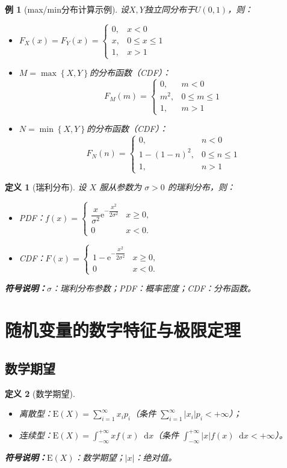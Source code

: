 \documentclass{article}
\newcommand{\E}{\mathrm{E}}
\newcommand{\dif}{\mathop{}\!\mathrm{d}}
\newcommand{\e}{\mathrm{e}}
\newcommand{\symnote}[1]{\par\noindent\textbf{符号说明：}#1\par}
\newcommand{\maxrv}[2]{\max\left\{#1,#2\right\}}
\newcommand{\minrv}[2]{\min\left\{#1,#2\right\}}
\theoremstyle{mytheorem}
\newtheorem{definition}{定义}[section]
\newtheorem{example}{例}[section]
\begin{document}
\begin{example}[max/min分布计算示例]
设$X,Y$独立同分布于$U(0,1)$，则：
\begin{itemize}
    \item $F_X(x)=F_Y(x)=\begin{cases}0, & x<0 \\ x, & 0\leq x\leq1 \\ 1, & x>1\end{cases}$

    \item $M=\maxrv{X}{Y}$的分布函数（CDF）：
    $$
    F_M(m)=\begin{cases}0, & m<0 \\ m^2, & 0\leq m\leq1 \\ 1, & m>1\end{cases}
    $$

    \item $N=\minrv{X}{Y}$的分布函数（CDF）：
    $$
    F_N(n)=\begin{cases}0, & n<0 \\ 1-(1-n)^2, & 0\leq n\leq1 \\ 1, & n>1\end{cases}
    $$
\end{itemize}
\end{example}

\begin{definition}[瑞利分布]
设 $X$ 服从参数为 $\sigma > 0$ 的瑞利分布，则：
\begin{itemize}
    \item PDF：$f(x) = \begin{cases}\dfrac{x}{\sigma^2} \e^{-\dfrac{x^2}{2\sigma^2}} & x \ge 0, \\ 0 & x < 0.\end{cases}$
    \item CDF：$F(x) = \begin{cases}1 - \e^{-\dfrac{x^2}{2\sigma^2}} & x \ge 0, \\ 0 & x < 0.\end{cases}$
\end{itemize}
\symnote{$\sigma$：瑞利分布参数；PDF：概率密度；CDF：分布函数。}
\end{definition}

\section{随机变量的数字特征与极限定理}
\subsection{数学期望}
\begin{definition}[数学期望]
\begin{itemize}
    \item 离散型：$\E(X) = \sum_{i=1}^{\infty} x_i p_i$（条件 $\sum_{i=1}^{\infty} |x_i| p_i < +\infty$）；
    \item 连续型：$\E(X) = \int_{-\infty}^{+\infty} x f(x) \dif x$（条件 $\int_{-\infty}^{+\infty} |x| f(x) \dif x < +\infty$）。
\end{itemize}
\symnote{$\E(X)$：数学期望；$|x|$：绝对值。}
\end{definition}
\end{document}
